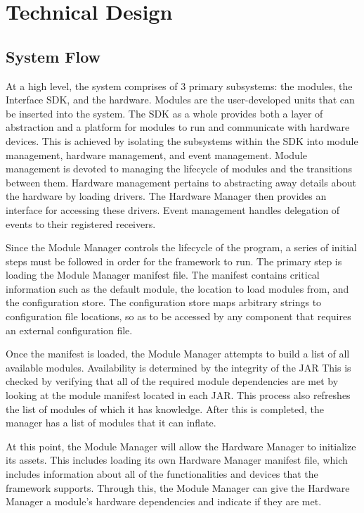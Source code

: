 \documentclass[11pt,letterpaper]{article}
\begin{document}
	\section{Technical Design}

	\subsection{System Flow}

	At a high level, the system comprises of 3 primary subsystems: the modules,
	the Interface SDK, and the hardware. Modules are the user-developed units 
	that can be inserted into the system. The SDK as a whole provides both a 
	layer of abstraction and a platform for modules to run and communicate 
	with hardware devices. This is achieved by isolating the subsystems within 
	the SDK into module management, hardware management, and event management. 
	Module management is devoted to managing the lifecycle of modules and the 
	transitions between them. Hardware management pertains to abstracting away 
	details about the hardware by loading drivers. The Hardware Manager then 
	provides an interface for accessing these drivers. Event management 
	handles delegation of events to their registered receivers.

	Since the Module Manager controls the lifecycle of the program, a series 
	of initial steps must be followed in order for the framework to run. The 
	primary step is loading the Module Manager manifest file. The manifest 
	contains critical information such as the default module, the location to 
	load modules from, and the configuration store. The configuration store 
	maps arbitrary strings to configuration file locations, so as to be 
	accessed by any component that requires an external configuration file.

	Once the manifest is loaded, the Module Manager attempts to build a list 
	of all available modules. Availability is determined by the integrity of 
	the JAR This is checked by verifying that all of the required module 
	dependencies are met by looking at the module manifest located in each JAR. 
	This process also refreshes the list of modules of which it has knowledge. 
	After this is completed, the manager has a list of modules that it can inflate.

	At this point, the Module Manager will allow the Hardware Manager to 
	initialize its assets. This includes loading its own Hardware Manager 
	manifest file, which includes information about all of the functionalities 
	and devices that the framework supports. Through this, the Module Manager 
	can give the Hardware Manager a module's hardware dependencies and 
	indicate if they are met.
\end{document}
